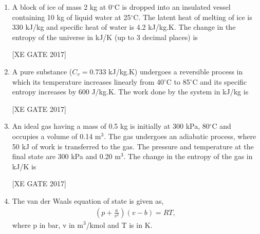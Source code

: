 \documentclass[journal,12pt,onecolumn]{IEEEtran}
\theoremstyle{remark}
\begin{document}
\begin{enumerate}
\hfill [XE GATE 2017]


\item A block of ice of mass 2 kg at 0$^\circ$C is dropped into an insulated vessel containing 10 kg of liquid water at 25$^\circ$C. The latent heat of melting of ice is 330 kJ/kg and specific heat of water is 4.2 kJ/kg.K. The change in the entropy of the universe in kJ/K (up to 3 decimal places) is  

\hfill [XE GATE 2017]


\item A pure substance ($C_v = 0.733$ kJ/kg.K) undergoes a reversible process in which its temperature increases linearly from 40$^\circ$C to 85$^\circ$C and its specific entropy increases by 600 J/kg.K. The work done by the system in kJ/kg is  

\hfill [XE GATE 2017]

\begin{enumerate}
\end{enumerate}


\item An ideal gas having a mass of 0.5 kg is initially at 300 kPa, 80$^\circ$C and occupies a volume of 0.14 m$^3$. The gas undergoes an adiabatic process, where 50 kJ of work is transferred to the gas. The pressure and temperature at the final state are 300 kPa and 0.20 m$^3$. The change in the entropy of the gas in kJ/K is  

\hfill [XE GATE 2017]

\begin{enumerate}
\end{enumerate}


\item The van der Waals equation of state is given as,  
\begin{align}
    \left( p + \frac{a}{v^2} \right)(v-b) = RT,
\end{align} 
where p in bar, v in m$^3$/kmol and T is in K.  


\end{enumerate}
\end{document}
